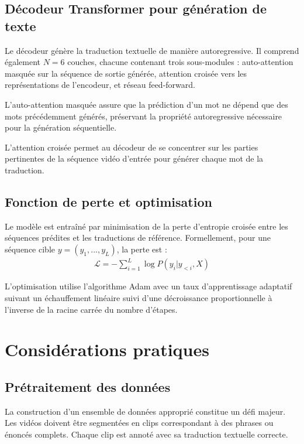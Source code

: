 \documentclass[twocolumn]{el-author}
\begin{document}
\subsection{Décodeur Transformer pour génération de texte}

Le décodeur génère la traduction textuelle de manière autoregressive. Il comprend également $N = 6$ couches, chacune contenant trois sous-modules : auto-attention masquée sur la séquence de sortie générée, attention croisée vers les représentations de l'encodeur, et réseau feed-forward.

L'auto-attention masquée assure que la prédiction d'un mot ne dépend que des mots précédemment générés, préservant la propriété autoregressive nécessaire pour la génération séquentielle.

L'attention croisée permet au décodeur de se concentrer sur les parties pertinentes de la séquence vidéo d'entrée pour générer chaque mot de la traduction.

\subsection{Fonction de perte et optimisation}

Le modèle est entraîné par minimisation de la perte d'entropie croisée entre les séquences prédites et les traductions de référence. Formellement, pour une séquence cible $y = (y_1, ..., y_L)$, la perte est :
\begin{align}
\mathcal{L} = -\sum_{i=1}^{L} \log P(y_i | y_{<i}, X)
\end{align}

L'optimisation utilise l'algorithme Adam avec un taux d'apprentissage adaptatif suivant un échauffement linéaire suivi d'une décroissance proportionnelle à l'inverse de la racine carrée du nombre d'étapes.

\section{Considérations pratiques}

\subsection{Prétraitement des données}

La construction d'un ensemble de données approprié constitue un défi majeur. Les vidéos doivent être segmentées en clips correspondant à des phrases ou énoncés complets. Chaque clip est annoté avec sa traduction textuelle correcte.
\end{document}
